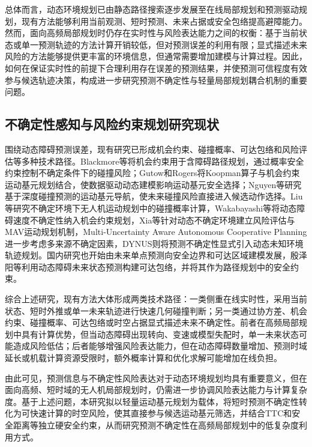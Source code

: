 总体而言，动态环境规划已由静态路径搜索逐步发展至在线局部规划和预测驱动规划，现有方法能够利用当前观测、短时预测、未来占据或安全包络提高避障能力。然而，面向高频局部规划时仍存在实时性与风险表达能力之间的权衡：基于当前状态或单一预测轨迹的方法计算开销较低，但对预测误差的利用有限；显式描述未来风险的方法能够提供更丰富的环境信息，但通常需要增加建模与计算过程。因此，如何在保证实时性的前提下合理利用存在误差的预测结果，并使预测可信程度有效参与候选轨迹决策，构成进一步研究预测不确定性与轻量局部规划耦合机制的重要问题。

\subsection{不确定性感知与风险约束规划研究现状}

围绕动态障碍预测误差，现有研究已形成机会约束、碰撞概率、可达包络和风险评估等多种技术路径。Blackmore等\cite{blackmore2011chance}将机会约束用于含障碍路径规划，通过概率安全约束控制不确定条件下的碰撞风险；Gutow和Rogers\cite{gutow2020koopman}将Koopman算子与机会约束运动基元规划结合，使数据驱动动态建模影响运动基元安全选择；Nguyen等\cite{nguyen2022collision}研究基于深度碰撞预测的运动基元导航，使未来碰撞风险直接进入候选动作选择。Liu等\cite{liu2023tight}研究不确定环境下无人机运动规划中的碰撞概率计算，Wakabayashi等\cite{wakabayashi2023}将动态障碍速度不确定性纳入机会约束规划，Xia等\cite{xia2024risk}针对动态不确定环境建立风险评估与MAV运动规划机制，Multi-Uncertainty Aware Autonomous Cooperative Planning\cite{zhang2024multiuncertainty}进一步考虑多来源不确定因素，DYNUS\cite{dynus}则将预测不确定性显式引入动态未知环境轨迹规划。国内研究也开始由未来单点预测向安全边界和可达区域建模发展，殷泽阳等\cite{yin2025envelope}利用动态障碍未来状态预测构建可达包络，并将其作为路径规划中的安全约束。

综合上述研究，现有方法大体形成两类技术路径：一类侧重在线实时性，采用当前状态、短时外推或单一未来轨迹进行快速几何碰撞判断；另一类通过协方差、机会约束、碰撞概率、可达包络或时空占据显式描述未来不确定性。前者在高频局部规划中具有计算优势，但当动态障碍出现转向、变速或模型失配时，单一未来状态可能造成风险低估；后者能够增强风险表达能力，但在动态障碍数量增加、预测时域延长或机载计算资源受限时，额外概率计算和优化求解可能增加在线负担。

由此可见，预测信息与不确定性风险表达对于动态环境规划均具有重要意义，但在面向高频、短时域的无人机局部规划时，仍需进一步协调风险表达能力与计算复杂度。基于上述问题，本研究拟以轻量运动基元规划为载体，将短时预测不确定性转化为可快速计算的时空风险，使其直接参与候选运动基元筛选，并结合TTC和安全距离等独立硬安全约束，从而研究预测不确定性在高频局部规划中的低复杂度利用方式。


